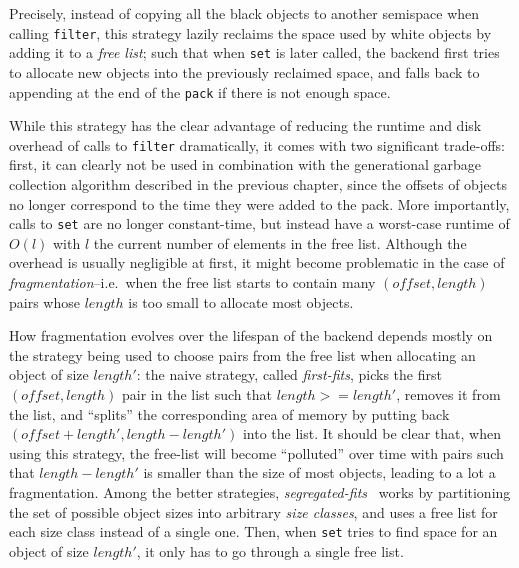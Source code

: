 \bigskip
Precisely, instead of copying all the black objects to another semispace when calling \texttt{filter}, this strategy lazily reclaims the space used by white objects by adding it to a \emph{free list}; such that when \texttt{set} is later called, the backend first tries to allocate new objects into the previously reclaimed space, and falls back to appending at the end of the \texttt{pack} if there is not enough space.

While this strategy has the clear advantage of reducing the runtime and disk overhead of calls to \texttt{filter} dramatically, it comes with two significant trade-offs: first, it can clearly not be used in combination with the generational garbage collection algorithm described in the previous chapter, since the offsets of objects no longer correspond to the time they were added to the pack. More importantly, calls to \texttt{set} are no longer constant-time, but instead have a worst-case runtime of \(O(l)\) with \(l\) the current number of elements in the free list. Although the overhead is usually negligible at first, it might become problematic in the case of \emph{fragmentation}--i.e.~when the free list starts to contain many \((offset, length)\) pairs whose \(length\) is too small to allocate most objects.

How fragmentation evolves over the lifespan of the backend depends mostly on the strategy being used to choose pairs from the free list when allocating an object of size \(length'\): the naive strategy, called \emph{first-fits}, picks the first \((offset, length)\) pair in the list such that \(length >= length'\), removes it from the list, and ``splits'' the corresponding area of memory by putting back \((offset + length', length - length')\) into the list. It should be clear that, when using this strategy, the free-list will become ``polluted'' over time with pairs such that \(length - length'\) is smaller than the size of most objects, leading to a lot a fragmentation. Among the better strategies, \emph{segregated-fits}~\cite{comf64} works by partitioning the set of possible object sizes into arbitrary \emph{size classes}, and uses a free list for each size class instead of a single one. Then, when \texttt{set} tries to find space for an object of size \(length'\), it only has to go through a single free list.

